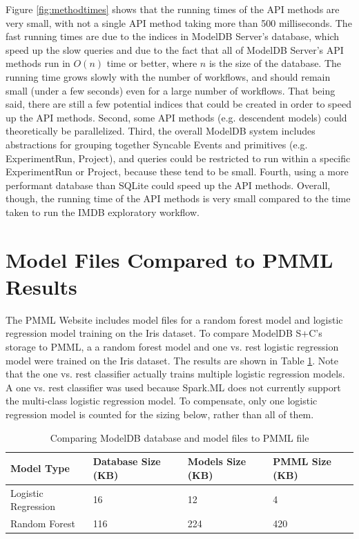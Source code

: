 Figure \ref{fig:methodtimes} shows that the running times of the API methods are
very small, with not a single API method taking more than 500 milliseconds. The fast running
times are due to the indices in ModelDB Server's database, which speed up the slow queries
and due to the fact that all of ModelDB Server's API methods run in $O(n)$ time or better, where
$n$ is the size of the database. The running time grows slowly with the number of workflows, and
should remain small (under a few seconds) even for a large number of workflows. That being said, there are still
a few potential indices that could be created in order to speed up the API methods. Second, some API
methods (e.g. descendent models) could theoretically be parallelized. Third, the overall ModelDB system includes
abstractions for grouping together Syncable Events and primitives (e.g. ExperimentRun, Project), and queries could be
restricted to run within a specific ExperimentRun or Project, because these tend to be small. Fourth,
using a more performant database than SQLite could speed up the API methods. Overall, though, the running
time of the API methods is very small compared to the time taken to run the IMDB exploratory workflow.

\section{Model Files Compared to PMML Results}
The PMML Website includes model files for a random forest model and logistic regression
model training on the Iris dataset. To compare ModelDB S+C's storage to PMML, a
a random forest model and one vs. rest logistic regression model were trained on the Iris
dataset. The results are shown in Table \ref{tab:pmml}. Note that the one vs. rest classifier
actually trains multiple logistic regression models. A one vs. rest classifier was used
because Spark.ML does not currently support the multi-class logistic regression model. To
compensate, only one logistic regression model is counted for the sizing below, rather than
all of them.

 \begin{table}
   \centering
    \begin{tabular}{ | l | l | l | l |}
      \hline
      Model Type & Database Size (KB) & Models Size (KB) & PMML Size (KB) \\ \hline
      Logistic Regression & 16 & 12 & 4 \\ \hline
      Random Forest & 116 & 224 & 420 \\ 
      \hline
   \end{tabular}
   \caption{Comparing ModelDB database and model files to PMML file}
   \label{tab:pmml}
 \end{table}

